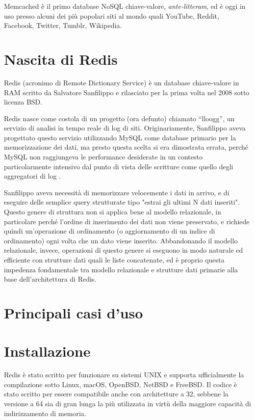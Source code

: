 Memcached è il primo database NoSQL chiave-valore, \emph{ante-litteram}, ed è oggi in uso presso alcuni
dei più popolari siti al mondo quali YouTube, Reddit, Facebook, Twitter, Tumblr, Wikipedia.


\section{Nascita di Redis}

Redis (acronimo di Remote Dictionary Service) è un database chiave-valore in RAM scritto
da Salvatore Sanfilippo e rilasciato per la prima volta nel 2008 sotto licenza BSD.

Redis nasce come costola di un progetto (ora defunto) chiamato ``lloogg'', un servizio di
analisi in tempo reale di log di siti. Originariamente, Sanfilippo aveva progettato
questo servizio utilizzando MySQL come database primario per la memorizzazione dei
dati, ma presto questa scelta si era dimostrata errata, perché MySQL non raggiungeva le
performance desiderate in un contesto particolarmente intensivo dal punto di vista delle
scritture come quello degli aggregatori di log \cite{nascita}.

Sanfilippo aveva necessità di memorizzare velocemente i dati in arrivo, e di eseguire
delle semplice query strutturate tipo "estrai gli ultimi N dati inseriti". Questo genere
di struttura non si applica bene al modello relazionale, in particolare perché l'ordine
di inserimento dei dati non viene preservato, e richiede quindi un'operazione di ordinamento
(o aggiornamento di un indice di ordinamento) ogni volta che un dato viene inserito.
Abbandonando il modello relazionale, invece, operazioni di questo genere si eseguono
in modo naturale ed efficiente con strutture dati quali le liste concatenate, ed è
proprio questa impedenza fondamentale tra modello relazionale e strutture dati primarie
alla base dell'architettura di Redis.

\section{Principali casi d'uso}


\section{Installazione}

Redis è stato scritto per funzionare su sistemi UNIX e supporta ufficialmente la
compilazione sotto Linux, macOS, OpenBSD, NetBSD e FreeBSD. Il codice è stato scritto
per essere compatibile anche con architetture a \SI{32}{\bit}, sebbene la versione a 
\SI{64}{\bit} sia di gran lunga la più utilizzata in virtù della maggiore capacità di 
indirizzamento di memoria.

